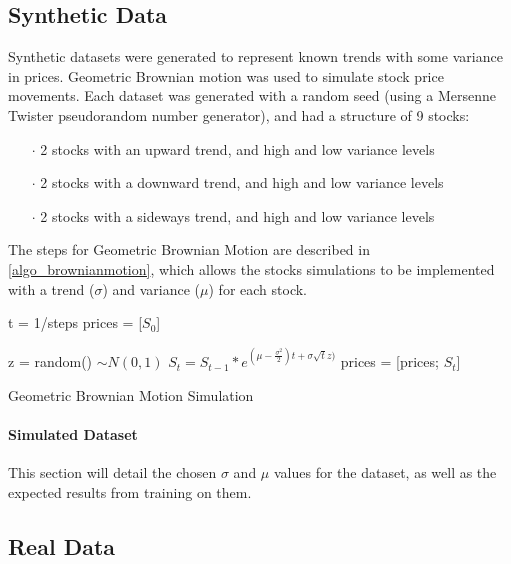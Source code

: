\documentclass[a4paper,latin]{paper}
\begin{document}
\subsection{Synthetic Data}\label{data_synthetic}

Synthetic datasets were generated to represent known trends with some variance in prices. Geometric Brownian motion was used to simulate stock price movements. Each dataset was generated with a random seed (using a Mersenne Twister pseudorandom number generator), and had a structure of 9 stocks:

\begin{itemize}
	\item [$\cdot$] 2 stocks with an upward trend, and high and low variance levels
	\item [$\cdot$] 2 stocks with a downward trend, and high and low variance levels
	\item [$\cdot$] 2 stocks with a sideways trend, and high and low variance levels
\end{itemize}

The steps for Geometric Brownian Motion are described in \ref{algo_brownianmotion}, which allows the stocks simulations to be implemented with a trend ($\sigma$) and variance ($\mu$) for each stock.\newline

\begin{algorithm}[H]

	t = 1/steps\;
	prices = [$S_0$]\;

	{
		z = random()  $\sim N(0,1)$\;
		$S_t = S_{t-1}*e^{(\mu - \frac {\sigma^2}{2})t + \sigma  \sqrt{t}  z)}$\;
		prices = [prices; $S_t$]\;
	}
	\label{algo_brownianmotion}
	\caption{Geometric Brownian Motion Simulation}
\end{algorithm}

\paragraph{Simulated Dataset}

This section will detail the chosen $\sigma$ and $\mu$ values for the dataset, as well as the expected results from training on them.


\subsection{Real Data}
\end{document}
